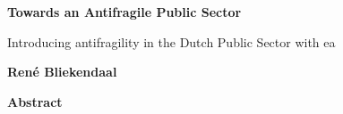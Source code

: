 \thispagestyle{plain}
{}
\begin{center}
	\Large
	\textbf{Towards an Antifragile Public Sector}
	
	\vspace{0.4cm}
	\large
	Introducing \Gls{antifragility} in the Dutch Public Sector with \gls{ea}
	
	\vspace{0.4cm}
	\textbf{René Bliekendaal}
	
	\vspace{0.9cm}
	\textbf{Abstract}
\end{center}

\lipsum[1]